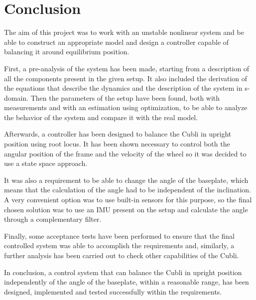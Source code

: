 \chapter{Conclusion}

The aim of this project was to work with an unstable nonlinear system and be able to construct an appropriate model and design a controller capable of balancing it around equilibrium position.

First, a pre-analysis of the system has been made, starting from a description of all the components present in the given setup. It also included the derivation of the equations that describe the dynamics and the description of the system in s-domain. Then the parameters of the setup have been found, both with measurements and with an estimation using optimization, to be able to analyze the behavior of the system and compare it with the real model.

Afterwards, a controller has been designed to balance the Cubli in upright position using root locus. It has been shown necessary to control both the angular position of the frame and the velocity of the wheel so it was decided to use a state space approach.

It was also a requirement to be able to change the angle of the baseplate, which means that the calculation of the angle had to be independent of the inclination. A very convenient option was to use built-in sensors for this purpose, so the final chosen solution was to use an IMU present on the setup and calculate the angle through a complementary filter.

Finally, some acceptance tests have been performed to ensure that the final controlled system was able to accomplish the requirements and, similarly, a further analysis has been carried out to check other capabilities of the Cubli.

In conclusion, a control system that can balance the Cubli in upright position independently of the angle of the baseplate, within a reasonable range, has been designed, implemented and tested successfully within the requirements.


